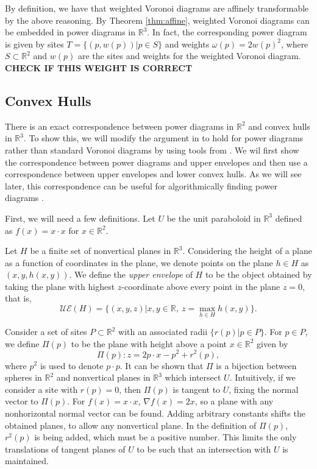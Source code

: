 \documentclass[a4paper, 11pt]{article}
\newcommand{\R}{\mathbb{R}}
\begin{document}
By definition, we have that weighted Voronoi diagrams are affinely transformable by the above reasoning. By Theorem \ref{thm:affine}, weighted Voronoi
diagrams can be embedded in power diagrams in $\R^3$. In fact, the corresponding power diagram is given by sites $T = \{ (p, w(p)) | p \in S \}$ and
weights $\omega(p) = 2 w(p)^2$, where $S \subset \R^2$ and $w(p)$ are the sites and weights for the weighted Voronoi diagram. \textbf{CHECK IF THIS
WEIGHT IS CORRECT}

\subsection{Convex Hulls}

There is an exact correspondence between power diagrams in $\R^2$ and convex hulls in $\R^3$. To show this, we will modify the argument in
\cite{comp_geom} to hold for power diagrams rather than standard Voronoi diagrams by using tools from \cite{aurenhammer_power}. We wil first show the correspondence between power diagrams and
upper envelopes and then use a correspondence between upper envelopes and lower convex hulls. As we will see later, this correspondence can be useful
for algorithmically finding power diagrams \cite{aurenhammer_power}.

First, we will need a few definitions. Let $U$ be the unit paraboloid in $\R^3$ defined as $f(x) = x \cdot x$ for $x \in \R^2$.

Let $H$ be a finite set of nonvertical planes in $\R^3$. Considering the height of a plane as a function of coordinates in the plane, we denote points
on the plane $h \in H$ as $(x,y,h(x,y))$. We define the \textit{upper envelope} of $H$ to be the object obtained by taking the plane with highest
$z$-coordinate above every point in the plane $z = 0$, that is,
\[ \mathcal{UE}(H) = \{ (x,y,z) | x,y \in \R, \ z = \max_{h \in H} h(x,y) \} .\]

Consider a set of sites $P \subset \R^2$ with an associated radii $\{r(p) | p \in P\}$. For $p \in P$, we define $\Pi(p)$ to be the plane with height above a point
$x \in \R^2$ given by
\[ \Pi(p) : z = 2 p \cdot x - p^2 + r^2(p) ,\]
where $p^2$ is used to denote $p \cdot p$. It can be shown that $\Pi$ is a bijection between spheres in $\R^2$ and nonvertical planes in $\R^3$ which
intersect $U$. Intuitively, if we consider a site with $r(p) = 0$, then $\Pi(p)$ is tangent to $U$, fixing the normal vector to $\Pi(p)$. For $f(x) =
x \cdot x$, $\nabla f(x) = 2x$, so a plane with any nonhorizontal normal vector can be found. Adding arbitrary constants shifts the obtained planes, to allow any
nonvertical plane. In the definition of $\Pi(p)$, $r^2(p)$ is being added, which must be a positive number. This limits the only translations of
tangent planes of $U$ to be such that an intersection with $U$ is maintained.
\end{document}
